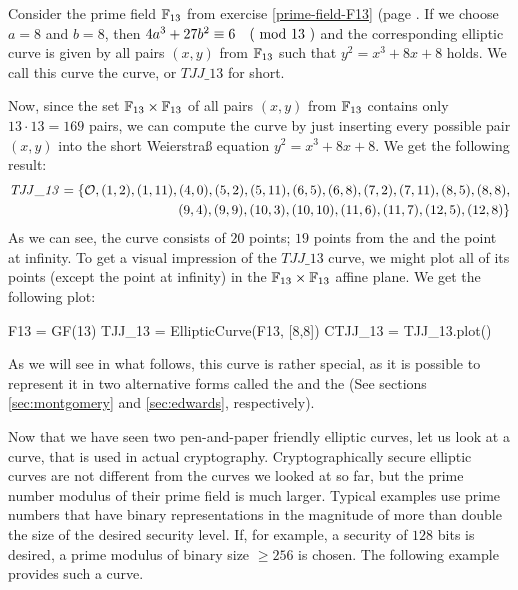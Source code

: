 \begin{example}\label{TJJ13} Consider the prime field $\mathbb{F}_{13}$ from exercise \ref{prime-field-F13} (page \pageref{prime-field-F13}. If we choose $a=8$ and $b=8$, then $4a^3+ 27b^2 \equiv 6 \quad \text{( mod } 13 \text{ )}$ and the corresponding elliptic curve is given by all pairs $(x,y)$ from $\mathbb{F}_{13}$ such that $y^2=x^3+8x+8$ holds. We call this curve the  curve, or  $\mathit{TJJ\_13}$ for short.

Now, since the set $\mathbb{F}_{13}\times \mathbb{F}_{13}$ of all pairs $(x,y)$ from $\mathbb{F}_{13}$ contains only $13\cdot 13=169$ pairs, we can compute the curve by just inserting every possible pair $(x,y)$ into the short Weierstraß equation $y^2 = x^3 +8x +8$.  We get the following result:
\begin{equation}\label{eq:TJJ13-weierstrass}
\begin{split}
\mathit{TJJ\_13} = \{\mathcal{O}, (1, 2), (1, 11), (4, 0), (5, 2), (5, 11), (6, 5), (6, 8), (7,2), (7, 11), (8, 5), (8, 8),\\ (9, 4), (9, 9), (10, 3), (10,
10), (11, 6), (11, 7), (12, 5), (12, 8)\}
\end{split}
\end{equation}
As we can see, the curve consists of $20$ points; $19$ points from the  and the point at infinity.
To get a visual impression of the $\mathit{TJJ\_13}$ curve, we might plot all of its points (except the point at infinity) in the $\mathbb{F}_{13}\times \mathbb{F}_{13}$ affine plane. We get the following plot: 
\begin{sagesilent}
F13 = GF(13)
TJJ_13 = EllipticCurve(F13, [8,8])
CTJJ_13 = TJJ_13.plot()
\end{sagesilent}
\begin{center} 
\end{center}
As we will see in what follows, this curve is rather special, as it is possible to represent it in two alternative forms called the  and the  (See sections \ref{sec:montgomery} and \ref{sec:edwards}, respectively).
\end{example}
Now that we have seen two pen-and-paper friendly elliptic curves, let us look at a curve, that is used in actual cryptography. Cryptographically secure elliptic curves are not  different from the curves we looked at so far, but the prime number modulus of their prime field is much larger. Typical examples use prime numbers that have binary representations in the magnitude of more than double the size of the desired security level. If, for example, a security of $128$ bits is desired, a prime modulus of binary size $\geq 256$ is chosen. The following example provides such a curve. 

